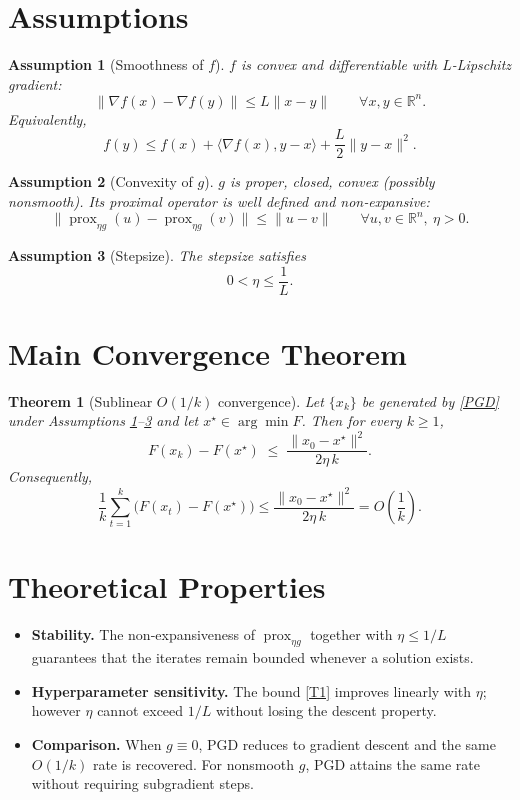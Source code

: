 \documentclass{article}
\newtheorem{theorem}{Theorem}
\newtheorem{assumption}{Assumption}
\newcommand{\prox}{\operatorname{prox}}
\newcommand{\R}{\mathbb{R}}
\begin{document}
\newpage

\section*{Assumptions}
\begin{assumption}[Smoothness of $f$]\label{ass:smooth}
$f$ is convex and differentiable with $L$-Lipschitz gradient:
\[
\|\nabla f(x)-\nabla f(y)\|\le L\|x-y\|\qquad\forall x,y\in\R^{n}.
\tag{A1}
\]
Equivalently,
\[
f(y)\le f(x)+\langle\nabla f(x),y-x\rangle+\frac{L}{2}\|y-x\|^{2}.
\tag{A1'}
\]
\end{assumption}

\begin{assumption}[Convexity of $g$]\label{ass:convex}
$g$ is proper, closed, convex (possibly nonsmooth). Its proximal operator is well defined and \emph{non‑expansive}:
\[
\|\prox_{\eta g}(u)-\prox_{\eta g}(v)\|\le\|u-v\|\qquad\forall u,v\in\R^{n},\ \eta>0.
\tag{A2}
\]
\end{assumption}

\begin{assumption}[Stepsize]\label{ass:stepsize}
The stepsize satisfies
\[
0<\eta\le\frac{1}{L}.
\tag{A3}
\]
\end{assumption}

\section*{Main Convergence Theorem}
\begin{theorem}[Sublinear $O(1/k)$ convergence]\label{thm:rate}
Let $\{x_{k}\}$ be generated by \eqref{PGD} under Assumptions \ref{ass:smooth}–\ref{ass:stepsize} and let $x^{\star}\in\arg\min F$.
Then for every $k\ge1$,
\[
F(x_{k})-F(x^{\star})\;\le\;\frac{\|x_{0}-x^{\star}\|^{2}}{2\eta\,k}.
\tag{T1}
\]
Consequently,
\[
\frac{1}{k}\sum_{t=1}^{k}\bigl(F(x_{t})-F(x^{\star})\bigr)
\le\frac{\|x_{0}-x^{\star}\|^{2}}{2\eta\,k}=O\!\left(\frac{1}{k}\right).
\tag{T2}
\]
\end{theorem}

\section*{Theoretical Properties}
\begin{itemize}
\item \textbf{Stability.} The non‑expansiveness of $\prox_{\eta g}$ together with $\eta\le1/L$ guarantees that the iterates remain bounded whenever a solution exists.
\item \textbf{Hyperparameter sensitivity.} The bound \eqref{T1} improves linearly with $\eta$; however $\eta$ cannot exceed $1/L$ without losing the descent property.
\item \textbf{Comparison.} When $g\equiv0$, PGD reduces to gradient descent and the same $O(1/k)$ rate is recovered. For nonsmooth $g$, PGD attains the same rate without requiring subgradient steps.
\end{itemize}
\end{document}

